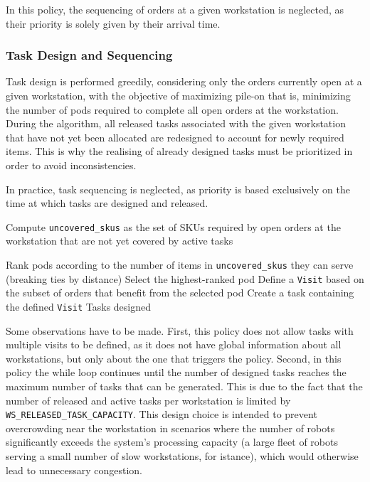 \documentclass[a4paper,10pt]{article}
\begin{document}
In this policy, the sequencing of orders at a given workstation is neglected, as their priority is solely given by their arrival time.

\subsubsection{Task Design and Sequencing}
Task design is performed greedily, considering only the orders currently open at a given workstation, with the objective of maximizing pile-on that is, minimizing the number of pods required to complete all open orders at the workstation.  
During the algorithm, all released tasks associated with the given workstation that have not yet been allocated are redesigned to account for newly required items. This is why the realising of already designed tasks must be prioritized in order to avoid inconsistencies.

In practice, task sequencing is neglected, as priority is based exclusively on the time at which tasks are designed and released.

\begin{algorithm}
\caption{Task Design}
\begin{algorithmic}[1]
\State Compute \texttt{uncovered\_skus} as the set of SKUs required by open orders at the workstation that are not yet covered by active tasks
    \State \Return
\EndIf

    \State Rank pods according to the number of items in \texttt{uncovered\_skus} they can serve (breaking ties by distance)
    \State Select the highest-ranked pod
    \State Define a \texttt{Visit} based on the subset of orders that benefit from the selected pod
    \State Create a task containing the defined \texttt{Visit}
\EndWhile
\State \Return Tasks designed
\end{algorithmic}
\end{algorithm}

Some observations have to be made. 
First, this policy does not allow tasks with multiple visits to be defined, as it does not have global information about all workstations, but only about the one that triggers the policy.
Second, in this policy the while loop continues until the number of designed tasks reaches the maximum number of tasks that can be generated. This is due to the fact that the number of released and active tasks per workstation is limited by \texttt{WS\_RELEASED\_TASK\_CAPACITY}. This design choice is intended to prevent overcrowding near the workstation in scenarios where the number of robots significantly exceeds the system's processing capacity (a large fleet of robots serving a small number of slow workstations, for istance), which would otherwise lead to unnecessary congestion.
\end{document}

